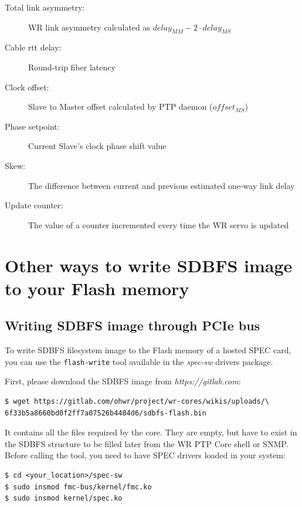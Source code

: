 \documentclass[a4paper, 12pt]{article}
\renewcommand{\_}{\underscore\allowbreak}
\begin{document}
\begin{description}
\item[Total link asymmetry:] WR link asymmetry calculated as
    $delay_{MM} - 2 \cdot delay_{MS}$

\item[Cable rtt delay:] Round-trip fiber latency

\item[Clock offset:] Slave to Master offset calculated by PTP daemon
  ($ offset_{MS} $)

\item[Phase setpoint:] Current Slave's clock phase shift value

\item[Skew:] The difference between current and previous estimated
    one-way link delay

\item[Update counter:] The value of a counter incremented every time
    the WR servo is updated

\end{description}
\renewcommand\arraystretch{1}


\clearpage
\section{Other ways to write SDBFS image to your Flash memory}
\label{appendix:writing_sdbfs}

\subsection{Writing SDBFS image through PCIe bus}
To write SDBFS filesystem image to the Flash memory of a hosted SPEC card, you
can use the \texttt{flash-write} tool available in the \emph{spec-sw} drivers
package.

First, please download the SDBFS image from \textit{https://gitlab.com}:
\begin{lstlisting}
$ wget https://gitlab.com/ohwr/project/wr-cores/wikis/uploads/\
6f33b5a8660bd0f2ff7a07526b4484d6/sdbfs-flash.bin
\end{lstlisting}
It contains all the files required by the core. They are empty, but have to
exist in the SDBFS structure to be filled later from the WR PTP Core shell or
SNMP.\\

Before calling the tool, you need to have SPEC drivers loaded in your system:
\begin{lstlisting}
$ cd <your_location>/spec-sw
$ sudo insmod fmc-bus/kernel/fmc.ko
$ sudo insmod kernel/spec.ko
\end{lstlisting}
\end{document}
